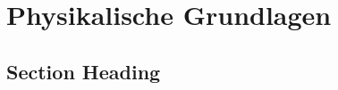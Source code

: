 \chapter{Physikalische Grundlagen}
\label{physics} %



\section{Section Heading}

\printbibliography

